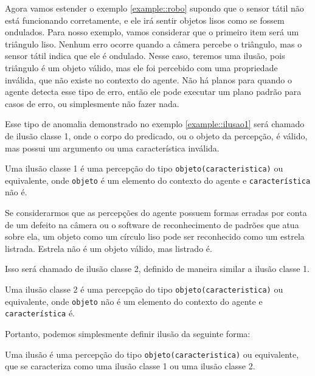 \begin{example}
Agora vamos estender o exemplo \ref{example::robo} supondo que o sensor tátil não está funcionando corretamente, e ele irá sentir objetos lisos como se fossem ondulados. Para nosso exemplo, vamos considerar que o primeiro item será um triângulo liso. Nenhum erro ocorre quando a câmera percebe o triângulo, mas o sensor tátil indica que ele é ondulado. Nesse caso, teremos uma ilusão, pois triângulo é um objeto válido, mas ele foi percebido com uma propriedade inválida, que não existe no contexto do agente. Não há planos para quando o agente detecta esse tipo de erro, então ele pode executar um plano padrão para casos de erro, ou simplesmente não fazer nada.
\label{example::ilusao1}
\end{example}{}

Esse tipo de anomalia demonstrado no exemplo \ref{example::ilusao1} será chamado de ilusão classe 1, onde o corpo do predicado, ou o objeto da percepção, é válido, mas possui um argumento ou uma característica inválida.

\begin{definition}{}
   Uma ilusão classe 1 é uma percepção do tipo \texttt{objeto(caracteristica)} ou equivalente, onde \texttt{objeto} é um elemento do contexto do agente e \texttt{característica} não é.
\end{definition}

\begin{example}
    Se considerarmos que as percepções do agente possuem formas erradas por conta de um defeito na câmera ou o software de reconhecimento de padrões que atua sobre ela, um objeto como um círculo liso pode ser reconhecido como um estrela listrada. Estrela não é um objeto válido, mas listrado é.
    \label{example::ilusao2}
\end{example}{}

Isso será chamado de ilusão classe 2, definido de maneira similar a ilusão classe 1.

\begin{definition}{}
   Uma ilusão classe 2 é uma percepção do tipo \texttt{objeto(caracteristica)} ou equivalente, onde \texttt{objeto} não é um elemento do contexto do agente e \texttt{característica} é.
\end{definition}

Portanto, podemos simplesmente definir ilusão da seguinte forma:

\begin{definition}{}
   Uma ilusão é uma percepção do tipo \texttt{objeto(caracteristica)} ou equivalente, que se caracteriza como uma ilusão classe 1 ou uma ilusão classe 2.
\end{definition}

